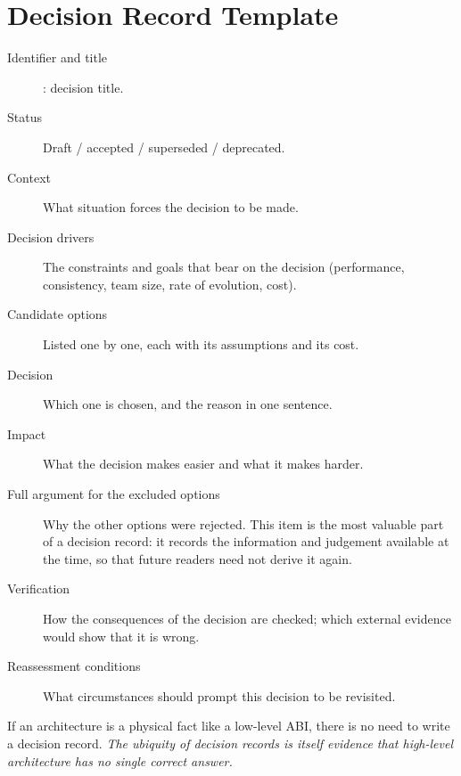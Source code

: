 \section{Decision Record Template}

\begin{description}
\item[Identifier and title] : decision title.
\item[Status] Draft / accepted / superseded / deprecated.
\item[Context] What situation forces the decision to be made.
\item[Decision drivers] The constraints and goals that bear on the decision (performance,
      consistency, team size, rate of evolution, cost).
\item[Candidate options] Listed one by one, each with its assumptions and its cost.
\item[Decision] Which one is chosen, and the reason in one sentence.
\item[Impact] What the decision makes easier and what it makes harder.
\item[Full argument for the excluded options] Why the other options were rejected. This item
      is the most valuable part of a decision record: it records the information and judgement
      available at the time, so that future readers need not derive it again.
\item[Verification] How the consequences of the decision are checked; which external evidence
      would show that it is wrong.
\item[Reassessment conditions] What circumstances should prompt this decision to be revisited.
\end{description}

\begin{principle}
If an architecture is a physical fact like a low-level ABI, there is no need to write a
decision record.
\emph{The ubiquity of decision records is itself evidence that high-level architecture has no
single correct answer.}
\end{principle}
